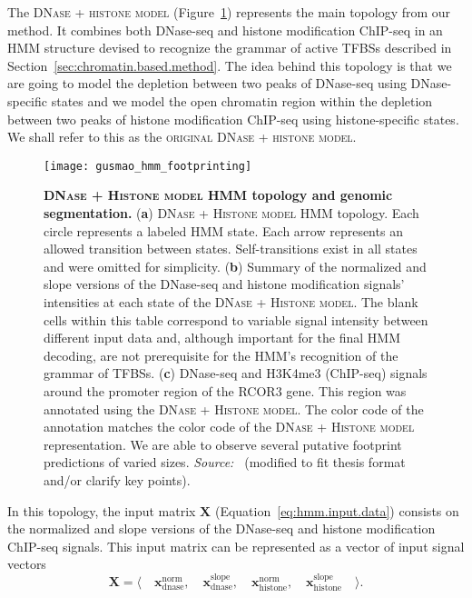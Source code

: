 The \textsc{DNase + histone model} (Figure~\ref{fig:gusmao_hmm_footprinting}) represents the main topology from our method. It combines both DNase-seq and histone modification ChIP-seq in an HMM structure devised to recognize the grammar of active TFBSs described in Section~\ref{sec:chromatin.based.method}. The idea behind this topology is that we are going to model the depletion between two peaks of DNase-seq using DNase-specific states and we model the open chromatin region within the depletion between two peaks of histone modification ChIP-seq using histone-specific states. We shall refer to this as the \textsc{original DNase + histone model}.

\begin{figure}[h!]
\centering
\texttt{[image: gusmao\_hmm\_footprinting]}
\caption[\textsc{DNase + Histone model} HMM topology and genomic segmentation]{\textbf{\textsc{DNase + Histone model} HMM topology and genomic segmentation.} (\textbf{a}) \textsc{DNase + Histone model} HMM topology. Each circle represents a labeled HMM state. Each arrow represents an allowed transition between states. Self-transitions exist in all states and were omitted for simplicity. (\textbf{b}) Summary of the normalized and slope versions of the DNase-seq and histone modification signals' intensities at each state of the \textsc{DNase + Histone model}. The blank cells within this table correspond to variable signal intensity between different input data and, although important for the final HMM decoding, are not prerequisite for the HMM's recognition of the grammar of TFBSs. (\textbf{c}) DNase-seq and H3K4me3 (ChIP-seq) signals around the promoter region of the RCOR3 gene. This region was annotated using the \textsc{DNase + Histone model}. The color code of the annotation matches the color code of the \textsc{DNase + Histone model} representation. We are able to observe several putative footprint predictions of varied sizes. \emph{Source:~\cite{gusmao2014}} (modified to fit thesis format and/or clarify key points).}
\label{fig:gusmao_hmm_footprinting}
\end{figure}

In this topology, the input matrix $\mathbf{X}$ (Equation~\ref{eq:hmm.input.data}) consists on the normalized and slope versions of the DNase-seq and histone modification ChIP-seq signals. This input matrix can be represented as a vector of input signal vectors
\begin{equation}
  \label{eq:signal.m1}
  \mathbf{X} = \langle \quad \mathbf{x}^{\text{norm}}_{\text{dnase}} ,\quad \mathbf{x}^{\text{slope}}_{\text{dnase}} ,\quad \mathbf{x}^{\text{norm}}_{\text{histone}} ,\quad \mathbf{x}^{\text{slope}}_{\text{histone}} \quad \rangle .
\end{equation}

